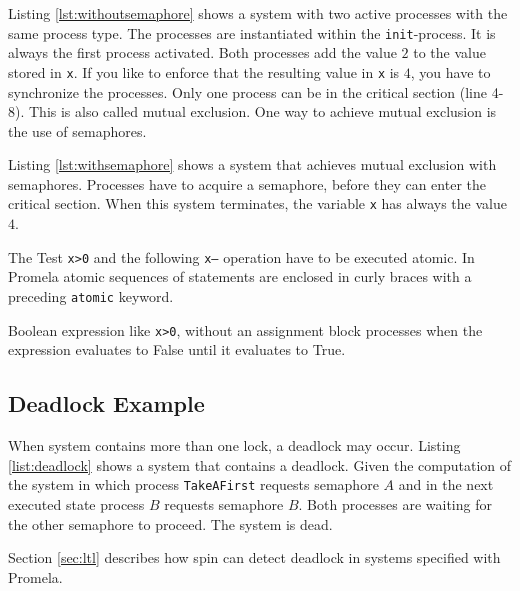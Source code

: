 \documentclass[12pt,a4paper,twoside]{article}
\begin{document}
Listing \ref{lst:withoutsemaphore} shows a system with two active processes with the same process type. The processes are instantiated within the \verb|init|-process. It is always the first process activated. Both processes add the value $2$ to the value stored in \verb|x|. If you like to enforce that the resulting value in \verb|x| is $4$, you have to synchronize the processes. Only one process can be in the critical section (line 4-8). This is also called mutual exclusion. One way to achieve mutual exclusion is the use of semaphores.



Listing \ref{lst:withsemaphore} shows a system that achieves mutual exclusion with semaphores. Processes have to acquire a semaphore, before they can enter the critical section. When this system terminates, the variable \verb|x| has always the value $4$.



The Test \texttt{x>0} and the following \texttt{x--} operation have to be executed atomic. In Promela atomic sequences of statements are enclosed in curly braces with a preceding \texttt{atomic} keyword.

Boolean expression like \verb|x>0|, without an assignment block processes when the expression evaluates to False until it evaluates to True.

\subsection{Deadlock Example}
\label{sec:deadlock}

When system contains more than one lock, a deadlock may occur. Listing \ref{list:deadlock} shows a system that contains a deadlock. Given the computation of the system in which process \texttt{TakeAFirst} requests semaphore $A$ and in the next executed state process $B$ requests semaphore $B$. Both processes are waiting for the other semaphore to proceed. The system is dead.



Section \ref{sec:ltl} describes how spin can detect deadlock in systems specified with Promela.
\end{document}
